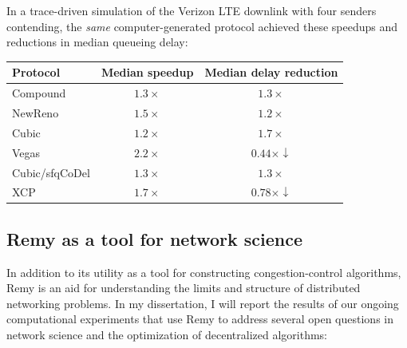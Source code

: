 \documentclass{article}
\begin{document}
\vspace{\baselineskip}

In a trace-driven simulation of the Verizon LTE downlink with four
senders contending, the \emph{same} computer-generated protocol achieved these
speedups and reductions in median queueing delay:

\vspace{\baselineskip}

\begin{centering}
{\footnotesize
\begin{tabular}{|l|c|c|}
\hline
Protocol & Median speedup & Median delay reduction \\
\hline
\hline
Compound & $1.3\times$ & $1.3\times$ \\
NewReno & $1.5\times$ & $1.2\times$ \\
Cubic & $1.2\times$ & $1.7\times$ \\
Vegas & $2.2\times$ & $0.44\times \downarrow$ \\
\hline
Cubic/sfqCoDel & $1.3\times$ & $1.3\times$ \\
XCP & $1.7\times$ & $0.78\times \downarrow$ \\
\hline
\end{tabular}
}

\end{centering}

\subsection*{Remy as a tool for network science}

In addition to its utility as a tool for constructing
congestion-control algorithms, Remy is an aid for understanding
the limits and structure of distributed networking problems. In my
dissertation, I will report the results of our ongoing computational
experiments that use Remy to address several open questions in network
science and the optimization of decentralized algorithms:
\end{document}
